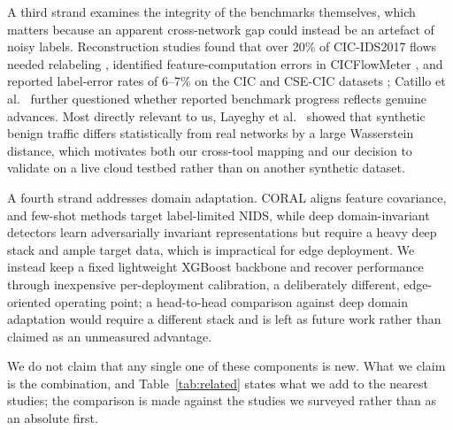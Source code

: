 \documentclass[11pt,a4paper]{article}
\begin{document}
A third strand examines the integrity of the benchmarks themselves, which matters
because an apparent cross-network gap could instead be an artefact of noisy labels.
Reconstruction studies found that over 20\% of CIC-IDS2017 flows needed relabeling
\cite{engelen}, identified feature-computation errors in CICFlowMeter \cite{rosay,lanvin},
and reported label-error rates of 6--7\% on the CIC and CSE-CIC datasets \cite{liu};
Catillo et al.\ \cite{catillo} further questioned whether reported benchmark progress
reflects genuine advances. Most directly relevant to us, Layeghy et al.\ \cite{layeghy}
showed that synthetic benign traffic differs statistically from real networks by a large
Wasserstein distance, which motivates both our cross-tool mapping and our decision to
validate on a live cloud testbed rather than on another synthetic dataset.

A fourth strand addresses domain adaptation. CORAL \cite{coral} aligns feature
covariance, and few-shot methods target label-limited NIDS, while deep
domain-invariant detectors learn adversarially invariant representations but require a
heavy deep stack and ample target data, which is impractical for edge deployment. We
instead keep a fixed lightweight XGBoost \cite{xgboost} backbone and recover performance
through inexpensive per-deployment calibration, a deliberately different, edge-oriented
operating point; a head-to-head comparison against deep domain adaptation would require
a different stack and is left as future work rather than claimed as an unmeasured
advantage.

We do not claim that any single one of these components is new. What we claim is the
combination, and Table~\ref{tab:related} states what we add to the nearest studies; the
comparison is made against the studies we surveyed rather than as an absolute first.
\end{document}

